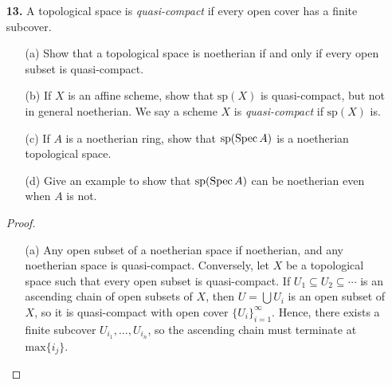 \documentclass{article}
\begin{document}
\begin{enumerate} [label=\textbf{\arabic*.}, leftmargin=0em]
\begin{proof}
    Let $X = \coprod X_i / \sim$, where the equivalence relation identifies $U_{ij}$ with $U_{ji}$ for all $i \neq j$. It is a scheme topologically, that is there is an open cover of $X$ such that each element of the cover is homeomorphic to the spectra of some ring. We have already have a scheme struture on each open subset $X_i$ of $X$, so by Exercise 1.22 we can obtain a unique sheaf on $X$ satisfies the properties above. In particular, the structure sheaf of $X$ is given by
    \begin{equation*}
        \fO_X(V) = \{ \langle s_i \rangle_{i \in I} \mid s_i \in \fO_X(\iota_i^{-1}(V)) \text{ and } \varphi_{ij}(\restr{s_i}{\iota^{-1}_i(V) \cap U_{ij}}) = \restr{s_j}{\iota_j^{-1}(V) \cap U_j} \}.
    \end{equation*}
\end{proof}

\item[\textbf{13.}] A topological space is \textit{quasi-compact} if every open cover has a finite subcover.
\begin{itemize}
    \item[(a)] Show that a topological space is noetherian if and only if every open subset is quasi-compact.
    \item[(b)] If $X$ is an affine scheme, show that $\text{sp}(X)$ is quasi-compact, but not in general noetherian. We say a scheme $X$ is \textit{quasi-compact} if $\text{sp}(X)$ is.
    \item[(c)] If $A$ is a noetherian ring, show that $\text{sp}(\operatorname{Spec}{A})$ is a noetherian topological space.
    \item[(d)] Give an example to show that $\text{sp}(\operatorname{Spec}{A})$ can be noetherian even when $A$ is not.
\end{itemize}

\begin{proof} $ $ \vspace{0pt}
    \begin{itemize} [leftmargin=0cm]
        \item[(a)] Any open subset of a noetherian space if noetherian, and any noetherian space is quasi-compact. Conversely, let $X$ be a topological space such that every open subset is quasi-compact. If $U_1 \subseteq U_2 \subseteq \cdots$ is an ascending chain of open subsets of $X$, then $U = \bigcup U_i$ is an open subset of $X$, so it is quasi-compact with open cover $\{ U_i \}_{i = 1}^\infty$. Hence, there exists a finite subcover $U_{i_1}, \dots, U_{i_n}$, so the ascending chain must terminate at $\text{max}\{i_j \}$. 


\end{itemize}
\end{proof}
\end{enumerate}
\end{document}
